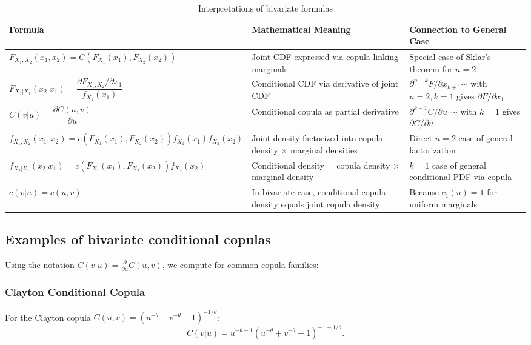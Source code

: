 \begin{table}[htpb]
\centering
\footnotesize
\caption{Interpretations of bivariate formulas}\label{tab:bivariate_interpretations}
\begin{tabular}{|p{}|p{}|p{}|}
\hline
\textbf{Formula} & \textbf{Mathematical Meaning} & \textbf{Connection to General Case} \\
\hline
\hline
$F_{X_1,X_2}(x_1,x_2)=C(F_{X_1}(x_1),F_{X_2}(x_2))$ & Joint CDF expressed via copula linking marginals & Special case of Sklar's theorem for $n=2$ \\
\hline
$F_{X_2|X_1}(x_2|x_1)=\dfrac{\partial F_{X_1,X_2}/\partial x_1}{f_{X_1}(x_1)}$ & Conditional CDF via derivative of joint CDF & $\partial^{n-k}F/\partial x_{k+1}\cdots$ with $n=2,k=1$ gives $\partial F/\partial x_1$ \\
\hline
$C(v|u)=\dfrac{\partial C(u,v)}{\partial u}$ & Conditional copula as partial derivative & $\partial^{k-1}C/\partial u_1\cdots$ with $k=1$ gives $\partial C/\partial u$ \\
\hline
$f_{X_1,X_2}(x_1,x_2)=c(F_{X_1}(x_1),F_{X_2}(x_2))f_{X_1}(x_1)f_{X_2}(x_2)$ & Joint density factorized into copula density × marginal densities & Direct $n=2$ case of general factorization \\
\hline
$f_{X_2|X_1}(x_2|x_1)=c(F_{X_1}(x_1),F_{X_2}(x_2))f_{X_2}(x_2)$ & Conditional density = copula density × marginal density & $k=1$ case of general conditional PDF via copula \\
\hline
$c(v|u)=c(u,v)$ & In bivariate case, conditional copula density equals joint copula density & Because $c_1(u)=1$ for uniform marginals \\
\hline
\end{tabular}
\end{table}


\subsection{Examples of bivariate conditional copulas}\label{subsec:bivariate_examples}
Using the notation $C(v|u) = \frac{\partial}{\partial u} C(u,v)$, we compute for common copula families:
\subsubsection*{Clayton Conditional Copula}
For the Clayton copula $C(u,v) = (u^{-\theta} + v^{-\theta} - 1)^{-1/\theta}$:
\begin{equation}
C(v|u) = u^{-\theta-1}(u^{-\theta} + v^{-\theta} - 1)^{-1-1/\theta}.
\end{equation}
